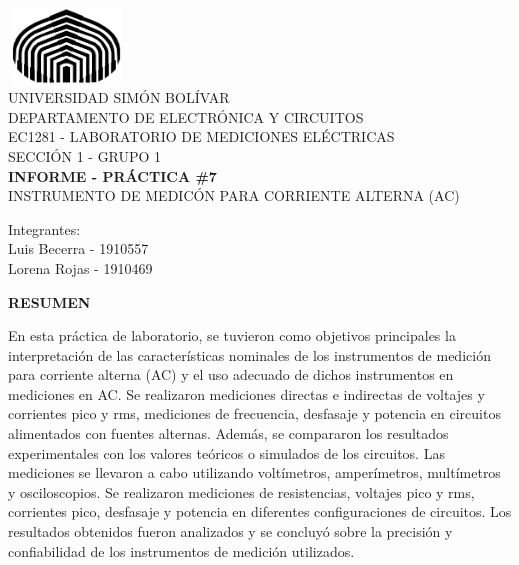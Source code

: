 \documentclass[12pt]{article}
\begin{document}
	
	\thispagestyle{empty}
	
	\begin{center}
		\includegraphics[width=3.1cm,height=2cm]{logo}\\
		UNIVERSIDAD SIMÓN BOLÍVAR\\
		DEPARTAMENTO DE ELECTRÓNICA Y CIRCUITOS\\
		EC1281 - LABORATORIO DE MEDICIONES ELÉCTRICAS\\
		SECCIÓN 1 - GRUPO 1\\
		
		\vspace{7cm}
		\textbf{\Large INFORME - PRÁCTICA \#7}\\
		INSTRUMENTO DE MEDICÓN PARA CORRIENTE ALTERNA (AC)\\
	\end{center}
	
	\begin{flushleft}
		\vspace{9cm}
		\hfill Integrantes:\\
		\hfill {\large Luis Becerra - 1910557}\\
		\hfill {\large Lorena Rojas - 1910469}\\
	\end{flushleft}
	
	\newpage
	
        \setcounter{page}{2}
	
	\begin{center}
		\textbf{\large RESUMEN}\\
	\end{center}
	
	En esta práctica de laboratorio, se tuvieron como objetivos principales la interpretación de las características nominales de los instrumentos de medición para corriente alterna (AC) y el uso adecuado de dichos instrumentos en mediciones en AC. Se realizaron mediciones directas e indirectas de voltajes y corrientes pico y rms, mediciones de frecuencia, desfasaje y potencia en circuitos alimentados con fuentes alternas. Además, se compararon los resultados experimentales con los valores teóricos o simulados de los circuitos. Las mediciones se llevaron a cabo utilizando voltímetros, amperímetros, multímetros y osciloscopios. Se realizaron mediciones de resistencias, voltajes pico y rms, corrientes pico, desfasaje y potencia en diferentes configuraciones de circuitos. Los resultados obtenidos fueron analizados y se concluyó sobre la precisión y confiabilidad de los instrumentos de medición utilizados.
	
\end{document}
